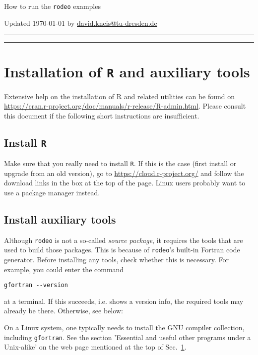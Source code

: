 \documentclass[10pt,a4paper]{article}
\author{dkneis}
\begin{document}
\newcommand{\software}[1]{\texttt{#1}}

{\LARGE How to run the \software{rodeo} examples}

\vspace{5mm}
Updated \today{} by \url{david.kneis@tu-dresden.de}

\vspace{5mm}
\hrule

\tableofcontents

\vspace{5mm}
\hrule

\section{Installation of \software{R} and auxiliary tools} \label{sec:install}

Extensive help on the installation of R and related utilities can be found on \url{https://cran.r-project.org/doc/manuals/r-release/R-admin.html}. Please consult this document if the following short instructions are insufficient.

\subsection{Install \software{R}}
Make sure that you really need to install \software{R}. If this is the case (first install or upgrade from an old version), go to \url{https://cloud.r-project.org/} and follow the download links in the box at the top of the page. Linux users probably want to use a package manager instead.

\subsection{Install auxiliary tools}
Although \software{rodeo} is not a so-called \emph{source package}, it requires the tools that are used to build those packages. This is because of \software{rodeo}'s built-in Fortran code generator. Before installing any tools, check whether this is necessary. For example, you could enter the command

\begin{verbatim}
gfortran --version
\end{verbatim}

at a terminal. If this succeeds, i.e. shows a version info, the required tools may already be there. Otherwise, see below:

On a Linux system, one typically needs to install the GNU compiler collection, including \software{gfortran}. See the section 'Essential and useful other programs under a Unix-alike' on the web page mentioned at the top of Sec.~\ref{sec:install}.
\end{document}

